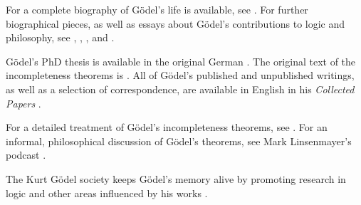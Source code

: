 \documentclass[../../../include/open-logic-section]{subfiles}
\begin{document}
\begin{reading}
For a complete biography of G{\"o}del's life is available, see
\citet{Dawson1997}. For further biographical pieces, as well as essays
about G{\"o}del's contributions to logic and philosophy, see
\citet{Wang1990}, \citet{Baaz2011}, \citet{Takeuti2003}, and
\citet{Sigmund2007}.

G{\"o}del's PhD thesis is available in the original German
\citep{Godel1929}.  The original text of the incompleteness theorems
is \citep{Godel1931}. All of G\"odel's published and unpublished
writings, as well as a selection of correspondence, are available in
English in his \emph{Collected Papers} \citet{Godel1986,Godel1990}.

For a detailed treatment of G{\"o}del's incompleteness theorems, see
\citet{Smith2013}. For an informal, philosophical discussion of
G{\"o}del's theorems, see Mark Linsenmayer's podcast
\citep{Linsenmayer2014}.

The Kurt G{\"o}del society keeps G{\"o}del's memory alive by promoting
research in logic and other areas influenced by his works
\citet{Society2015}.
\end{reading}
\end{document}
